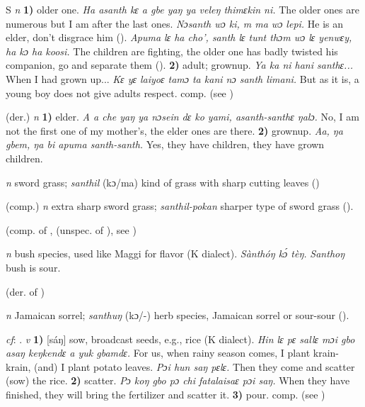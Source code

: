 \begin{letter}{S}
 \textit{n} \textbf{1)} older one. \textit{Ha asanth kɛ a gbe yaŋ ya veleŋ thimɛkin ni.} The older ones are numerous but I am after the last ones. \textit{Nɔsanth wɔ ki, m ma wɔ lepi.} He is an elder, don't disgrace him (\citealt{Pichl1967}). \textit{Apuma lɛ ha cho', santh lɛ tunt thɔm wɔ lɛ yenwɛy, ha kɔ ha koosi.} The children are fighting, the older one has badly twisted his companion, go and separate them (\citealt{Pichl1967}). \textbf{2)} adult; grownup. \textit{Ya ka ni hani santhɛ...} When I had grown up... \textit{Kɛ yɛ laiyoɛ tamɔ ta kani nɔ santh limani.} But as it is, a young boy does not give adults respect. comp.  (see ) 

 (der.) \textit{n} \textbf{1)} elder. \textit{A a che yaŋ ya nɔsein dɛ ko yami, asanth-santhɛ ŋalɔ.} No, I am not the first one of my mother's, the elder ones are there. \textbf{2)} grownup. \textit{Aa, ŋa gbem, ŋa bi apuma santh-santh.} Yes, they have children, they have grown children.

 \textit{n} sword grass; \textit{santhil} (kɔ/ma) kind of grass with sharp cutting leaves (\citealt{Pichl1967})

 (comp.) \textit{n} extra sharp sword grass; \textit{santhil-pokan} sharper type of sword grass (\citealt{Pichl1967}). 

 (comp. of ,  (unspec. of ), see ) 

 \textit{n} bush species, used like Maggi for flavor (K dialect). \textit{Sànthóŋ kɔ́ tèŋ.} \textit{Santhoŋ} bush is sour.

 (der. of ) 

 \textit{n} Jamaican sorrel; \textit{santhuŋ} (kɔ/-) herb species, Jamaican sorrel or sour-sour (\citealt{Pichl1967}). 

 \textit{cf}: . \textit{v} \textbf{1)} [sáŋ] sow, broadcast seeds, e.g., rice (K dialect). \textit{Hin lɛ pɛ sallɛ mɔi gbo asaŋ keŋkendɛ a yuk gbamdɛ.} For us, when rainy season comes, I plant krain-krain, (and) I plant potato leaves. \textit{Pɔi hun saŋ pɛlɛ.} Then they come and scatter (sow) the rice. \textbf{2)} scatter. \textit{Pɔ koŋ gbo pɔ chi fatalaisaɛ pɔi saŋ.} When they have finished, they will bring the fertilizer and scatter it. \textbf{3)} pour. comp.  (see ) 


\end{letter}
